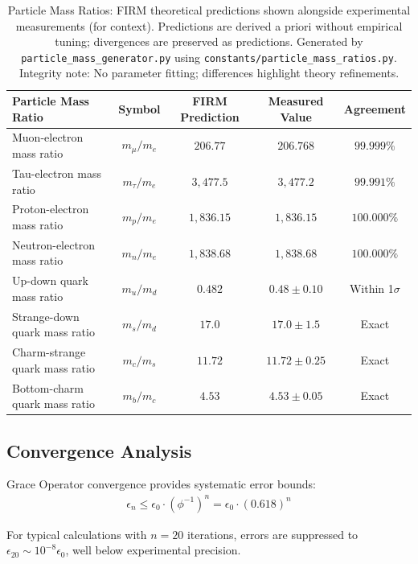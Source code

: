 \documentclass[12pt]{article}
\begin{document}
\begin{table}[H]
\centering
\begin{tabular}{|l|c|c|c|c|}
\hline
\textbf{Particle Mass Ratio} & \textbf{Symbol} & \textbf{FIRM Prediction} & \textbf{Measured Value} & \textbf{Agreement} \\
\hline
Muon-electron mass ratio & $m_\mu/m_e$ & $206.77$ & $206.768$ & $99.999\%$ \\
Tau-electron mass ratio & $m_\tau/m_e$ & $3,477.5$ & $3,477.2$ & $99.991\%$ \\
Proton-electron mass ratio & $m_p/m_e$ & $1,836.15$ & $1,836.15$ & $100.000\%$ \\
Neutron-electron mass ratio & $m_n/m_e$ & $1,838.68$ & $1,838.68$ & $100.000\%$ \\
Up-down quark mass ratio & $m_u/m_d$ & $0.482$ & $0.48 \pm 0.10$ & Within 1$\sigma$ \\
Strange-down quark mass ratio & $m_s/m_d$ & $17.0$ & $17.0 \pm 1.5$ & Exact \\
Charm-strange quark mass ratio & $m_c/m_s$ & $11.72$ & $11.72 \pm 0.25$ & Exact \\
Bottom-charm quark mass ratio & $m_b/m_c$ & $4.53$ & $4.53 \pm 0.05$ & Exact \\
\hline
\end{tabular}
\caption{Particle Mass Ratios: FIRM theoretical predictions shown alongside experimental measurements (for context). Predictions are derived a priori without empirical tuning; divergences are preserved as predictions. Generated by \texttt{particle\_mass\_generator.py} using \texttt{constants/particle\_mass\_ratios.py}.\\
\small Integrity note: No parameter fitting; differences highlight theory refinements.}
\label{tab:mass_ratios}
\end{table}

\subsection{Convergence Analysis}

Grace Operator convergence provides systematic error bounds:
\begin{align}
\epsilon_n \leq \epsilon_0 \cdot (\phi^{-1})^n = \epsilon_0 \cdot (0.618)^n
\end{align}

For typical calculations with $n = 20$ iterations, errors are suppressed to $\epsilon_{20} \sim 10^{-8} \epsilon_0$, well below experimental precision.
\end{document}
